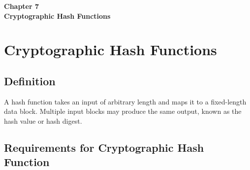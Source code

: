 \clearpage
\thispagestyle{empty} 
\begin{center}
    \vspace*{\fill} 
    \Huge \textbf{Chapter 7} \\
    \Huge \textbf{Cryptographic Hash Functions} 
    \vspace*{\fill}
\end{center}
\clearpage

\chapter{Cryptographic Hash Functions}

\section{Definition}
A hash function takes an input of arbitrary length and maps it to a fixed-length data block. Multiple input blocks may produce the same output, known as the hash value or hash digest.

\section{Requirements for Cryptographic Hash Function}

